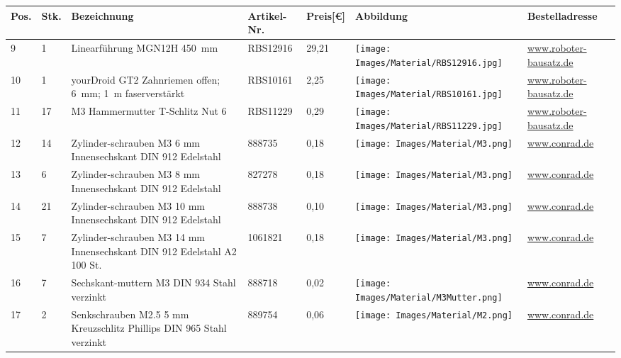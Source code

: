 \begin{center}
		\fontsize{8}{10}\selectfont
		\begin{tabularx}{\textwidth}{|p{0.4cm}|p{0.4cm}|X|X|p{1cm}|X|X|}
		\hline 
		\textbf{Pos.} & \textbf{Stk.} & \textbf{Bezeichnung} & \textbf{Artikel-Nr.}& \textbf{Preis[€]} & \textbf{Abbildung} & \textbf{Bestelladresse} \\ \hline	
		9 & 1 & Linearführung MGN12H 450\ mm & RBS12916 & 29,21  &  \texttt{[image: Images/Material/RBS12916.jpg]} & \href{https://www.roboter-bausatz.de/p/linearfuehrung-mgn12h-450mm}{www.roboter-bausatz.de} \\
		\hline			
		10 & 1 & yourDroid GT2 Zahnriemen offen; 6\ mm; 1\ m faserverstärkt & RBS10161 & 2,25  & \texttt{[image: Images/Material/RBS10161.jpg]} & \href{https://www.roboter-bausatz.de/p/yourdroid-gt2-zahnriemen-offen-6mm-1-meter-faserverstaerkt}{www.roboter-bausatz.de} \\
		\hline
		11 & 17 & M3 Hammermutter T-Schlitz Nut 6 &  RBS11229 & 0,29   & \texttt{[image: Images/Material/RBS11229.jpg]} & \href{https://www.roboter-bausatz.de/p/m3-hammermutter-t-schlitz-nut-6}{www.roboter-bausatz.de} \\
		\hline
		12 & 14 & Zylinder-schrauben M3 6 mm Innensechskant DIN 912 Edelstahl & 888735 & 0,18  & \texttt{[image: Images/Material/M3.png]} &
		\href{https://www.conrad.de/de/p/toolcraft-888735-zylinderschrauben-m3-6-mm-innensechskant-din-912-edelstahl-a2-1-st-888735.html}{www.conrad.de} \\
		\hline
		13 & 6 & Zylinder-schrauben M3 8 mm Innensechskant DIN 912 Edelstahl & 827278 & 0,18  & \texttt{[image: Images/Material/M3.png]} &
		\href{https://www.conrad.de/de/p/toolcraft-827278-zylinderschrauben-m3-8-mm-innensechskant-din-912-stahl-8-8-geschwaerzt-1-st-827278.html}{www.conrad.de} \\
		\hline
		14 & 21 & Zylinder-schrauben M3 10 mm Innensechskant DIN 912 Edelstahl & 888738 & 0,10  & \texttt{[image: Images/Material/M3.png]} &
		\href{https://www.conrad.de/de/p/toolcraft-888738-zylinderschrauben-m3-10-mm-innensechskant-din-912-edelstahl-a2-1-st-888738.html}{www.conrad.de} \\
		\hline
		15 & 7 & Zylinder-schrauben M3 14 mm Innensechskant DIN 912 Edelstahl A2 100 St. & 1061821 & 0,18  & \texttt{[image: Images/Material/M3.png]} &
		\href{https://www.conrad.de/de/p/toolcraft-1061821-zylinderschrauben-m3-14-mm-innensechskant-din-912-edelstahl-a2-100-st-1061821.html}{www.conrad.de} \\
		\hline
		16 & 7 & Sechskant-muttern M3 DIN 934 Stahl verzinkt & 888718  & 0,02 & \texttt{[image: Images/Material/M3Mutter.png]} &
		\href{https://www.conrad.de/de/p/toolcraft-888718-sechskantmuttern-m3-din-934-stahl-verzinkt-1-st-888718.html}{www.conrad.de} \\
		\hline
		17 & 2 & Senkschrauben M2.5 5 mm Kreuzschlitz Phillips DIN 965 Stahl verzinkt & 889754 & 0,06  & \texttt{[image: Images/Material/M2.png]} &
		\href{https://www.conrad.de/de/p/toolcraft-889754-senkschrauben-m2-5-5-mm-kreuzschlitz-phillips-din-965-stahl-verzinkt-1-st-889754.html}{www.conrad.de} \\
		\hline
	

\end{tabularx}
\end{center}
